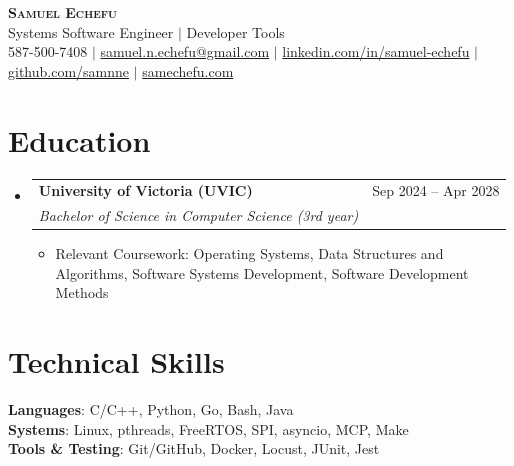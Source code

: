 \documentclass[letterpaper,10pt]{article}
\makeatletter
\newcommand{\resumeItem}[1]{
  \item\small{
    {#1 \vspace{-1pt}}
  }
}
\newcommand{\resumeSubheading}[4]{
  \vspace{-2pt}\item
    \begin{tabular*}{0.97\textwidth}[t]{l@{\extracolsep{\fill}}r}
      \textbf{#1} & #2 \\
      \textit{\small#3} & \textit{\small #4} \\
    \end{tabular*}\vspace{-6pt}
}
\newcommand{\resumeSubHeadingListStart}{\begin{itemize}[leftmargin=0.15in, label={}]}
\newcommand{\resumeSubHeadingListEnd}{\end{itemize}}
\newcommand{\resumeItemListStart}{\begin{itemize}[label=$\bullet$, itemsep=0.75pt, topsep=0pt, parsep=0pt]}
\newcommand{\resumeItemListEnd}{\end{itemize}\vspace{-2pt}}
\makeatother
\begin{document}
\begin{center}
    \textbf{\Huge \scshape Samuel Echefu} \\ \vspace{3pt}
    \small Systems Software Engineer $|$ Developer Tools \\ \vspace{3pt}
    \small 587-500-7408 $|$ \href{mailto:samuel.n.echefu@gmail.com}{samuel.n.echefu@gmail.com} $|$ 
    \href{https://linkedin.com/in/samuel-echefu-251a21336}{linkedin.com/in/samuel-echefu} $|$
    \href{https://github.com/samnne}{github.com/samnne} $|$
    \href{https://samechefu.com}{samechefu.com}
\end{center}


\section{Education}
\resumeSubHeadingListStart
\resumeSubheading{University of Victoria (UVIC)}{Sep 2024 -- Apr 2028}{Bachelor of Science in Computer Science (3rd year)}{}
\resumeItemListStart
  \resumeItem{Relevant Coursework: Operating Systems, Data Structures and Algorithms, Software Systems Development, Software Development Methods}
\resumeItemListEnd
\resumeSubHeadingListEnd

\section{Technical Skills}
 \begin{itemize}[leftmargin=0.15in, label={}]
    \small{\item{
     \textbf{Languages}{: C/C++, Python, Go, Bash, Java} \\ \vspace{0pt}
     \textbf{Systems}{: Linux, pthreads, FreeRTOS, SPI, asyncio, MCP, Make} \\ \vspace{0pt}
     \textbf{Tools \& Testing}{: Git/GitHub, Docker, Locust, JUnit, Jest}
    }}
 \end{itemize}
\end{document}
